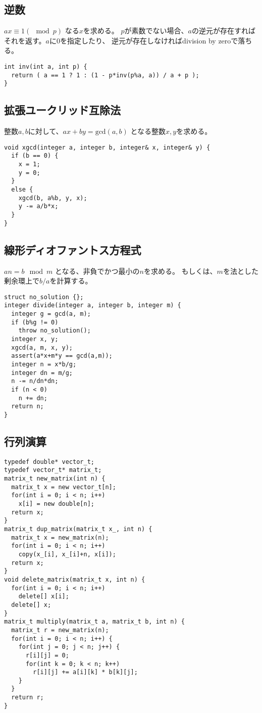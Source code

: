 \subsection{逆数}

$ a x \equiv 1 (\mod p)$ なる$x$を求める。
$p$が素数でない場合、$a$の逆元が存在すればそれを返す。$a$に0を指定したり、
逆元が存在しなければdivision by zeroで落ちる。

\begin{lstlisting}
int inv(int a, int p) {
  return ( a == 1 ? 1 : (1 - p*inv(p%a, a)) / a + p );
}
\end{lstlisting}


\subsection{拡張ユークリッド互除法}

整数$a, b$に対して、$ax + by = \mathrm{gcd}(a, b)$ となる整数$x, y$を求める。

\begin{lstlisting}
void xgcd(integer a, integer b, integer& x, integer& y) {
  if (b == 0) {
    x = 1;
    y = 0;
  }
  else {
    xgcd(b, a%b, y, x);
    y -= a/b*x;
  }
}
\end{lstlisting}


\subsection{線形ディオファントス方程式}

$an = b \mod m$ となる、非負でかつ最小の$n$を求める。
もしくは、$m$を法とした剰余環上で$b/a$を計算する。


\begin{lstlisting}
struct no_solution {};
integer divide(integer a, integer b, integer m) {
  integer g = gcd(a, m);
  if (b%g != 0)
    throw no_solution();
  integer x, y;
  xgcd(a, m, x, y);
  assert(a*x+m*y == gcd(a,m));
  integer n = x*b/g;
  integer dn = m/g;
  n -= n/dn*dn;
  if (n < 0)
    n += dn;
  return n;
}
\end{lstlisting}



\subsection{行列演算}

\begin{lstlisting}
typedef double* vector_t;
typedef vector_t* matrix_t;
matrix_t new_matrix(int n) {
  matrix_t x = new vector_t[n];
  for(int i = 0; i < n; i++)
    x[i] = new double[n];
  return x;
}
matrix_t dup_matrix(matrix_t x_, int n) {
  matrix_t x = new_matrix(n);
  for(int i = 0; i < n; i++)
    copy(x_[i], x_[i]+n, x[i]);
  return x;
}
void delete_matrix(matrix_t x, int n) {
  for(int i = 0; i < n; i++)
    delete[] x[i];
  delete[] x;
}
matrix_t multiply(matrix_t a, matrix_t b, int n) {
  matrix_t r = new_matrix(n);
  for(int i = 0; i < n; i++) {
    for(int j = 0; j < n; j++) {
      r[i][j] = 0;
      for(int k = 0; k < n; k++)
        r[i][j] += a[i][k] * b[k][j];
    }
  }
  return r;
}
\end{lstlisting}

